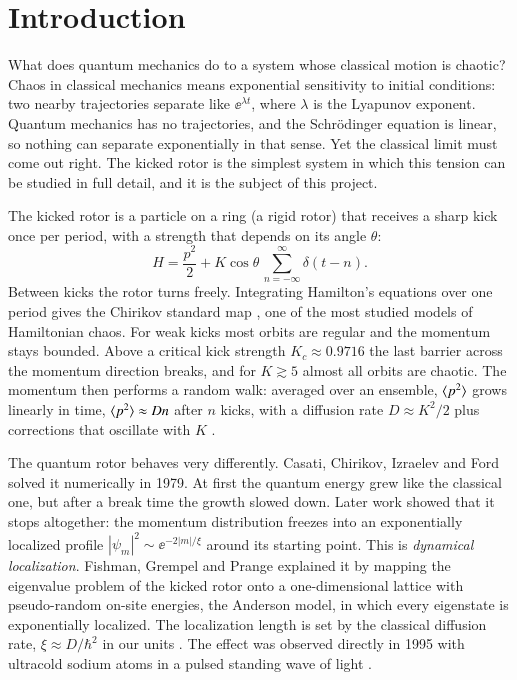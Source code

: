 \section{Introduction}
\label{sec:intro}

What does quantum mechanics do to a system whose classical motion is chaotic? Chaos in classical mechanics
means exponential sensitivity to initial conditions: two nearby trajectories separate like $\ee^{\lambda t}$,
where $\lambda$ is the Lyapunov exponent. Quantum mechanics has no trajectories, and the Schr\"odinger equation
is linear, so nothing can separate exponentially in that sense. Yet the classical limit must come out right.
The kicked rotor is the simplest system in which this tension can be studied in full detail, and it is the
subject of this project.

The kicked rotor is a particle on a ring (a rigid rotor) that receives a sharp kick once per period, with a
strength that depends on its angle $\theta$:
\begin{equation}
  H = \frac{p^2}{2} + K\cos\theta\,\sum_{n=-\infty}^{\infty}\delta(t - n).
  \label{eq:hamiltonian}
\end{equation}
Between kicks the rotor turns freely. Integrating Hamilton's equations over one period gives the Chirikov
standard map \cite{Chirikov1979}, one of the most studied models of Hamiltonian chaos. For weak kicks most
orbits are regular and the momentum stays bounded. Above a critical kick strength
$K_c \approx 0.9716$ \cite{Greene1979} the last barrier across the momentum direction breaks, and for
$K \gtrsim 5$ almost all orbits are chaotic. The momentum then performs a random walk: averaged over an
ensemble, $\langle p^2 \rangle$ grows linearly in time, $\langle p^2 \rangle \approx Dn$ after $n$ kicks, with a diffusion rate
$D \approx K^2/2$ plus corrections that oscillate with $K$ \cite{Chirikov1979,Rechester1980,Rechester1981}.

The quantum rotor behaves very differently. Casati, Chirikov, Izraelev and Ford \cite{Casati1979} solved it
numerically in 1979. At first the quantum energy grew like the classical one, but after a break time the
growth slowed down. Later work showed that it stops altogether: the momentum distribution freezes into an
exponentially localized profile $|\psi_m|^2 \sim \ee^{-2|m|/\xi}$ around its starting point. This is
\emph{dynamical localization}. Fishman, Grempel and Prange \cite{Fishman1982} explained it by mapping the
eigenvalue problem of the kicked rotor onto a one-dimensional lattice with pseudo-random on-site energies,
the Anderson model, in which every eigenstate is exponentially localized. The localization length is set by
the classical diffusion rate, $\xi \approx D/\hbar^2$ in our units \cite{Shepelyansky1986,Izrailev1990}. The
effect was observed directly in 1995 with ultracold sodium atoms in a pulsed standing wave of light
\cite{Moore1995}.

